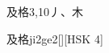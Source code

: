 \begin{entry}{及格}{3,10}{⼃、⽊}
  \begin{phonetics}{及格}{ji2ge2}[][HSK 4]
  \end{phonetics}
\end{entry}

